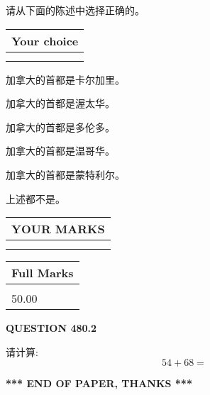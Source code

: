 \documentclass{ctexart}
\begin{document}
  
请从下面的陈述中选择正确的。
  
  
\noindent\hspace{3.0in} \begin{tabular}{|l|}
\hline
Your choice \\
\hline
 \\ 
 \\ 
\hline
\end{tabular}
  
  
 
 
加拿大的首都是卡尔加里。
 
 
加拿大的首都是渥太华。
 
 
加拿大的首都是多伦多。
 
 
加拿大的首都是温哥华。
 
 
加拿大的首都是蒙特利尔。
 
 
 上述都不是。
 
 
  
\vspace{0.2in}
  
\noindent\begin{tabular}{|l|}
\hline
 YOUR MARKS  \\
\hline
 \\ 
 \\ 
\hline
\end{tabular}
\hspace{0.05in} \begin{tabular}{|l|}
\hline
 Full Marks  \\
\hline
 \\ 
50.00 \\
\hline
\end{tabular}
{\textbf{\Large{QUESTION
480.2 
}}}
  
  
 
请计算:
\begin{equation}
54 +  %
68 = \nonumber
\end{equation}
 

 

 
   
   
 \vspace{0.2in}
 
   
   
   
   
\vspace{1.0in} 
{\textbf{\large{ *** END OF PAPER, THANKS *** }}} 
   
\end{document}
